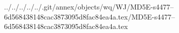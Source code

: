 ../../../../../.git/annex/objects/wq/WJ/MD5E-s4477--6d568438148cac3873095d8fac84ea4a.tex/MD5E-s4477--6d568438148cac3873095d8fac84ea4a.tex